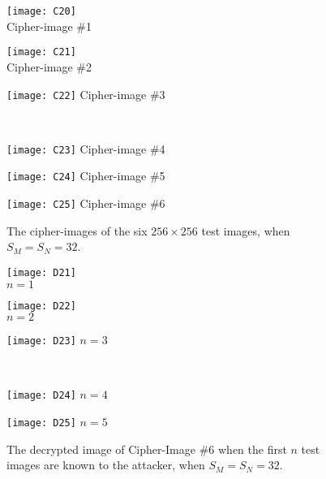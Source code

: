 \documentclass[final,3p,times,twocolumn]{elsarticle}
\newlength\figwidth
\newlength\sfigwidth
\newlength\vfigskip
\begin{document}
\begin{figure}[!htb]
\centering
\begin{minipage}{\sfigwidth}
\centering
\texttt{[image: C20]}\\
Cipher-image \#1
\end{minipage}
\begin{minipage}{\sfigwidth}
\centering
\texttt{[image: C21]}\\
Cipher-image \#2
\end{minipage}
\begin{minipage}{\sfigwidth}
\centering
\texttt{[image: C22]}
Cipher-image \#3
\end{minipage}\\[\vfigskip]
\begin{minipage}{\sfigwidth}
\centering
\texttt{[image: C23]}
Cipher-image \#4
\end{minipage}
\begin{minipage}{\sfigwidth}
\centering
\texttt{[image: C24]}
Cipher-image \#5
\end{minipage}
\begin{minipage}{\sfigwidth}
\centering
\texttt{[image: C25]}
Cipher-image \#6
\end{minipage}
\caption{The cipher-images of the six $256\times 256$ test images,
when $S_M=S_N=32$.} \label{figure:Experiment32}
\end{figure}

\begin{figure}[!htb]
\centering
\begin{minipage}{\sfigwidth}
\centering
\texttt{[image: D21]}\\
$n=1$
\end{minipage}
\begin{minipage}{\sfigwidth}
\centering
\texttt{[image: D22]}\\
$n=2$
\end{minipage}
\begin{minipage}{\sfigwidth}
\centering
\texttt{[image: D23]}
$n=3$
\end{minipage}\\[\vfigskip]
\begin{minipage}{\sfigwidth}
\centering
\texttt{[image: D24]}
$n=4$
\end{minipage}
\begin{minipage}{\sfigwidth}
\centering
\texttt{[image: D25]}
$n=5$
\end{minipage}
\caption{The decrypted image of Cipher-Image \#6 when the first
$n$ test images are known to the attacker, when $S_M=S_N=32$.}
\label{figure:Decrypted32}
\end{figure}
\end{document}
